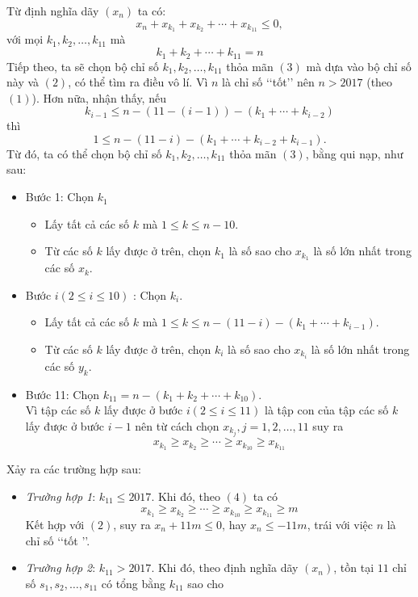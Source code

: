 \begin{bt}
{		Từ định nghĩa dãy $\left(x_n\right)$ ta có:
		\[x_n+x_{k_1}+x_{k_2}+\cdots+x_{k_{11}}\le 0,\tag{2}\]
		với mọi $k_1,k_2,\ldots,k_{11}$ mà
		\[k_1+k_2+\cdots+k_{11}=n\tag{3}\]
		Tiếp theo, ta sẽ chọn bộ chỉ số $k_1,k_2,\dots,k_{11}$ thỏa mãn $(3)$ mà dựa vào bộ chỉ số này và $(2)$, có thể tìm ra điều vô lí.
		Vì $n$ là chỉ số \lq\lq tốt\rq\rq \hspace{0.05cm} nên $n>2017$ (theo $(1)$).
		Hơn nữa, nhận thấy, nếu
		\[k_{i-1}\le n-\left(11-\left(i-1\right)\right)-\left(k_1+\cdots+ k_{i-2}\right)\]
		thì 
		\[1\le n-\left(11-i\right) -\left(k_1+\cdots+k_{i-2}+k_{i-1}\right). \]
		Từ đó, ta có thể chọn bộ chỉ số $k_1,k_2,\ldots,k_{11}$ thỏa mãn $(3)$, bằng qui nạp, như sau:
		\begin{itemize}
			\item Bước 1: Chọn $k_1$
			\begin{itemize}
				\item Lấy tất cả các số $k$ mà $1\le k\le n-10$.
				\item Từ các số $k$ lấy được ở trên, chọn $k_1$ là số sao cho $x_{k_{1}}$ là số lớn nhất trong các số $x_k$.
			\end{itemize}
			\item Bước $i\left(2\le i\le 10\right)$ : Chọn $k_i$.
			\begin{itemize}
				\item Lấy tất cả các số $k$ mà $1\le k\le n-\left(11-i\right)-\left(k_1+\cdots+k_{i-1}\right)$.
				\item Từ các số $k$ lấy được ở trên, chọn $k_i$ là số sao cho $x_{k_i}$ là số lớn nhất trong các số $y_k$.
			\end{itemize}
			\item Bước 11: Chọn $k_{11}=n-\left(k_1+k_2+\cdots+k_{10}\right)$.\\
			Vì tập các số $k$ lấy được ở bước $i\left(2\le i\le 11\right)$ là tập con của tập các số $k$ lấy được ở bước $i-1$ nên từ cách chọn $x_{k_j},j=1,2,\ldots,11$ suy ra
			\[x_{k_1}\ge x_{k_2}\ge\cdots\ge x_{k_{10}}\ge x_{k_{11}}\tag{4}\]
		\end{itemize}
		Xảy ra các trường hợp sau:
		\begin{itemize}
			\item \textit{Trường hợp 1}: $k_{11}\le 2017$. Khi đó, theo $(4)$ ta có
			\[x_{k_1}\ge x_{k_2}\ge \cdots \ge x_{k_{10}}\ge x_{k_{11}}\ge m\]
			Kết hợp với $(2)$, suy ra $x_n+11m\le 0$, hay $x_n\le -11m$, trái với việc $n$ là chỉ số \lq\lq tốt \rq\rq.
			\item \textit{Trường hợp 2}: $k_{11}>2017$. Khi đó, theo định nghĩa dãy $\left(x_n\right)$, tồn tại $11$ chỉ số $s_1,s_2,\ldots,s_{11}$ có tổng bằng $k_{11}$ sao cho 

\end{itemize}}
\end{bt}
